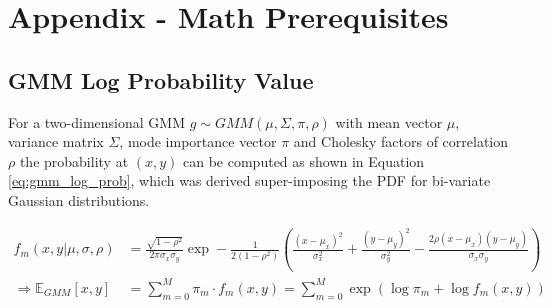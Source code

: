\chapter{Appendix - Math Prerequisites}

\section{GMM Log Probability Value}
\label{appendix:gmm_log_prob}
For a two-dimensional \ac{GMM} $g \sim GMM(\mu, \Sigma, \pi, \rho)$ with mean vector $\mu$, variance matrix $\Sigma$, mode importance vector $\pi$ and Cholesky factors of correlation $\rho$ the probability at $(x, y)$ can be computed as shown in Equation \ref{eq:gmm_log_prob}, which was derived super-imposing the \ac{PDF} for bi-variate Gaussian distributions.

\begin{align}
f_m(x, y | \mu, \sigma, \rho) &= {\frac{\sqrt{1- \rho^2}}{2 \pi \sigma_x \sigma_y} 
\exp - \frac{1}{2 (1 - \rho^2)}} \left( \frac{( x - \mu _x)^2}{\sigma_x^2} +
\frac {(y - \mu_y)^2}{\sigma_y^2}-{\frac {2\rho (x - \mu_x)(y - \mu_y)}
{\sigma_x \sigma_y}} \right)	 \\
\Rightarrow \mathbb{E}_{GMM}[x, y] &= \sum_{m=0}^M \pi_m \cdot f_m(x, y) =  \sum_{m=0}^M \exp \left( \log \pi_m + \log f_m(x, y) \right)
\label{eq:gmm_log_prob}
\end{align}

